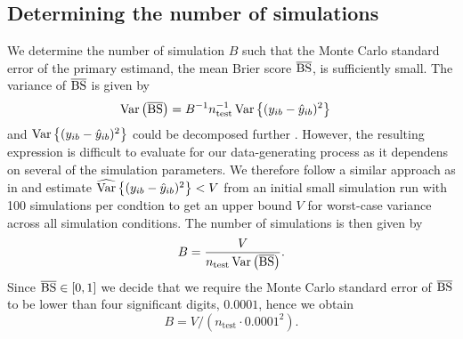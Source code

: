 \documentclass[a4paper, 11pt]{article}\usepackage[]{graphicx}\usepackage[]{color}
\begin{document}
\subsection{Determining the number of simulations}
We determine the number of simulation $B$ such that the Monte Carlo
standard error of the primary estimand, the mean Brier score $\operatorname{\overline{BS}}$,
is sufficiently small. The variance of $\operatorname{\overline{BS}}$ is given by
\begin{align*}
  \operatorname{Var}\left(\operatorname{\overline{BS}}\right)
  &= B^{-1}n_{\text{test}}^{-1}\operatorname{Var}\left\{(y_{ib} - \hat{y}_{ib})^{2}\right\}
\end{align*}
and $\operatorname{Var}\left\{(y_{ib} - \hat{y}_{ib})^{2}\right\}$ could be decomposed further
\citep{Bradley2008}. However, the resulting expression is difficult to evaluate
for our data-generating process as it dependens on several of the simulation
parameters. We therefore follow a similar approach as in \citet{Morris2019} and
estimate $\widehat{\operatorname{Var}}\left\{(y_{ib} - \hat{y}_{ib})^{2}\right\} < V$ from an
initial small simulation run with 100 simulations per condtion to get an upper
bound $V$ for worst-case variance across all simulation conditions. The number
of simulations is then given by
$$B = \frac{V}{n_{\text{test}} \operatorname{Var}\left(\operatorname{\overline{BS}}\right)}.$$
Since $\operatorname{\overline{BS}} \in [0, 1]$ we decide that we require the Monte Carlo standard error
of $\operatorname{\overline{BS}}$ to be lower than four significant digits, $0.0001$, hence we obtain
$$B =V/(n_{\text{test}} \cdot 0.0001^{2}).$$

\end{document}
